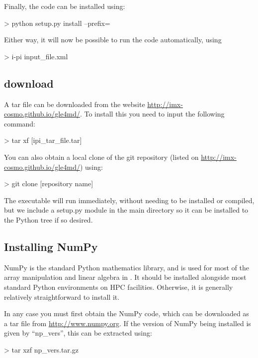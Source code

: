 \documentclass[11pt,english,fleqn]{report}
\newenvironment{code}{%
\footnotesize 
\verbatim
}{
\endverbatim
\normalsize
}
\begin{document}
Finally, the code can be installed using:

\begin{code}
> python setup.py install --prefix=~
\end{code}

Either way, it will now be possible to run the code automatically, using

\begin{code}
> i-pi input_file.xml
\end{code}

\subsection{\ipi download}

A tar file can be downloaded from the website \url{http://imx-cosmo.github.io/gle4md/}.
To install this you need to input the following command:

\begin{code}
> tar xf [ipi_tar_file.tar]
\end{code}


You can also obtain a local clone of the git repository (listed on \url{http://imx-cosmo.github.io/gle4md/}) using:

\begin{code}
> git clone [repository name]
\end{code}

The \ipi executable will run immediately, without needing to be installed
or compiled, but we include a setup.py module in the main directory so it can
be installed to the Python tree if so desired.

\subsection{Installing NumPy}

NumPy is the standard Python mathematics library, and is used for
most of the array manipulation and linear algebra in \ipi. It should
be installed alongside most standard Python environments on HPC facilities.
Otherwise, it is generally relatively straightforward to install it. 

In any case you must first obtain the NumPy code, which can be downloaded
as a tar file from \url{http://www.numpy.org}. If the version of
NumPy being installed is given by {}``np\_vers'', this can be extracted
using:

\begin{code}
> tar xzf np_vers.tar.gz
\end{code}
\end{document}
